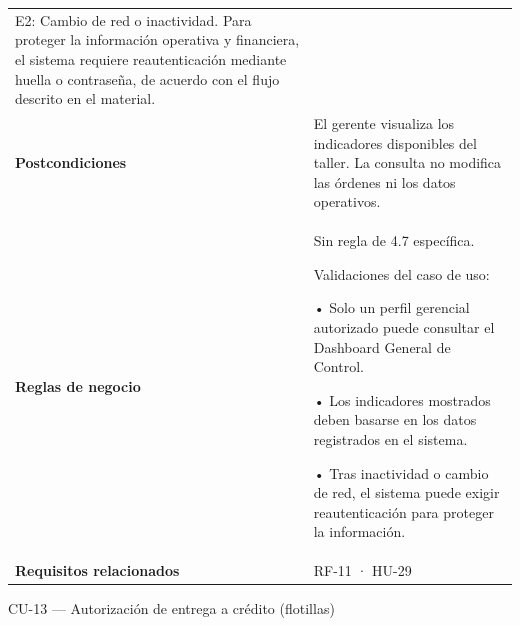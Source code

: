 {\begin{longtable}[]{@{}
  >{\raggedright\arraybackslash}p{}
  >{\raggedright\arraybackslash}p{}@{}}
E2: Cambio de red o inactividad. Para proteger la información operativa
y financiera, el sistema requiere reautenticación mediante huella o
contraseña, de acuerdo con el flujo descrito en el material. \\
\textbf{Postcondiciones} & El gerente visualiza los indicadores
disponibles del taller. La consulta no modifica las órdenes ni los datos
operativos. \\
\textbf{Reglas de negocio} & Sin regla de 4.7 específica.

Validaciones del caso de uso:

• Solo un perfil gerencial autorizado puede consultar el Dashboard
General de Control.

• Los indicadores mostrados deben basarse en los datos registrados en el
sistema.

• Tras inactividad o cambio de red, el sistema puede exigir
reautenticación para proteger la información. \\
\textbf{Requisitos relacionados} & RF-11 · HU-29 \\
\end{longtable}
}

CU-13 --- Autorización de entrega a crédito (flotillas)

